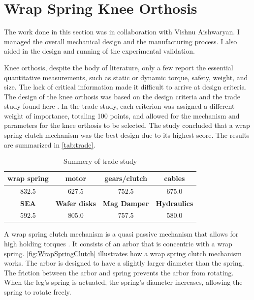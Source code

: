 
\section{Wrap Spring Knee Orthosis}
\label{sec:knee}

The work done in this section was in collaboration with  Vishnu Aishwaryan. I managed the overall mechanical design and the manufacturing process. I also aided in the design and running of the experimental validation.

Knee orthosis, despite the body of literature, only a few report the essential quantitative measurements, such as static or dynamic torque, safety, weight, and size. The lack of critical information made it difficult to arrive at design criteria. The design of the knee orthosis was based on the design criteria and the trade study found here \cite{subra2020design}. In the trade study, each criterion was assigned a different weight of importance, totaling 100 points, and allowed for the mechanism and parameters for the knee orthosis to be selected. The study concluded that a wrap spring clutch mechanism was the best design due to its highest score. The results are summarized in \autoref{tab:trade}.


\begin{table}[h!]
  \begin{center}
    \begin{tabular}{c|c|c|c} %
      \textbf{wrap spring} & \textbf{motor} & \textbf{gears/clutch} & \textbf{cables} \\
      \hline \hline
      832.5 & 627.5 & 752.5 & 675.0 \\
      \hline
      \textbf{SEA}  & \textbf{Wafer disks}  & \textbf{Mag Damper} & \textbf{Hydraulics} \\
      \hline \hline
      592.5 & 805.0 & 757.5 & 580.0\\
    \end{tabular}
  \end{center}
      \caption[Knee Trade Study]{Summery of trade study}
    \label{tab:trade}
\end{table}


A wrap spring clutch mechanism is a quasi passive mechanism that allows for high holding torques \cite{irby1999optimization} \cite{tung2013design}. It consists of an arbor that is concentric with a wrap spring. \autoref{fig:WrapSpringClutch} illustrates how a wrap spring clutch mechanism works. The arbor is designed to have a slightly larger diameter than the spring. The friction between the arbor and spring prevents the arbor from rotating. When the leg's spring is actuated, the spring's diameter increases, allowing the spring to rotate freely. 

